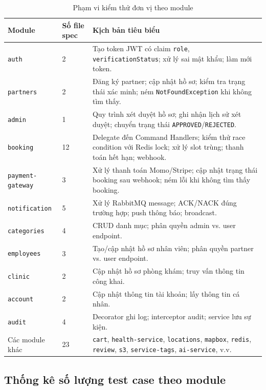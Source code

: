 \begin{table}[H]
\centering
\begin{tabularx}{\textwidth}{|p{}|p{}|X|}
\hline
\textbf{Module} & \textbf{Số file spec} & \textbf{Kịch bản tiêu biểu} \\
\hline
\texttt{auth} & 2 & Tạo token JWT có claim \texttt{role}, \texttt{verificationStatus}; xử lý sai mật khẩu; làm mới token. \\
\hline
\texttt{partners} & 2 & Đăng ký partner; cập nhật hồ sơ; kiểm tra trạng thái xác minh; ném \texttt{NotFoundException} khi không tìm thấy. \\
\hline
\texttt{admin} & 1 & Quy trình xét duyệt hồ sơ; ghi nhận lịch sử xét duyệt; chuyển trạng thái \texttt{APPROVED}/\texttt{REJECTED}. \\
\hline
\texttt{booking} & 12 & Delegate đến Command Handlers; kiểm thử race condition với Redis lock; xử lý slot trùng; thanh toán hết hạn; webhook. \\
\hline
\texttt{payment-gateway} & 3 & Xử lý thanh toán Momo/Stripe; cập nhật trạng thái booking sau webhook; ném lỗi khi không tìm thấy booking. \\
\hline
\texttt{notification} & 5 & Xử lý RabbitMQ message; ACK/NACK đúng trường hợp; push thông báo; broadcast. \\
\hline
\texttt{categories} & 4 & CRUD danh mục; phân quyền admin vs. user endpoint. \\
\hline
\texttt{employees} & 3 & Tạo/cập nhật hồ sơ nhân viên; phân quyền partner vs. user endpoint. \\
\hline
\texttt{clinic} & 2 & Cập nhật hồ sơ phòng khám; truy vấn thông tin công khai. \\
\hline
\texttt{account} & 2 & Cập nhật thông tin tài khoản; lấy thông tin cá nhân. \\
\hline
\texttt{audit} & 4 & Decorator ghi log; interceptor audit; service lưu sự kiện. \\
\hline
Các module khác & 23 & \texttt{cart}, \texttt{health-service}, \texttt{locations}, \texttt{mapbox}, \texttt{redis}, \texttt{review}, \texttt{s3}, \texttt{service-tags}, \texttt{ai-service}, v.v. \\
\hline
\end{tabularx}
\caption{Phạm vi kiểm thử đơn vị theo module}
\label{tab:unittest_coverage}
\end{table}

\subsection{Thống kê số lượng test case theo module}

